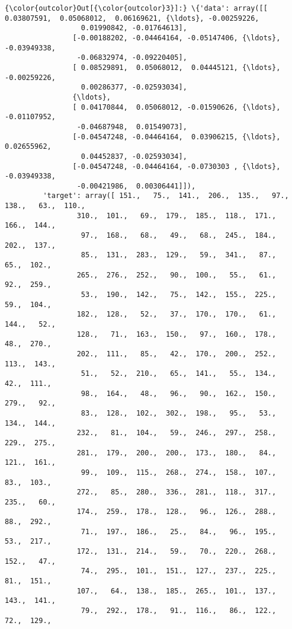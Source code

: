 \documentclass[11pt]{article}
\begin{document}
\begin{Verbatim}[commandchars=\\\{\}]
{\color{outcolor}Out[{\color{outcolor}3}]:} \{'data': array([[ 0.03807591,  0.05068012,  0.06169621, {\ldots}, -0.00259226,
                  0.01990842, -0.01764613],
                [-0.00188202, -0.04464164, -0.05147406, {\ldots}, -0.03949338,
                 -0.06832974, -0.09220405],
                [ 0.08529891,  0.05068012,  0.04445121, {\ldots}, -0.00259226,
                  0.00286377, -0.02593034],
                {\ldots}, 
                [ 0.04170844,  0.05068012, -0.01590626, {\ldots}, -0.01107952,
                 -0.04687948,  0.01549073],
                [-0.04547248, -0.04464164,  0.03906215, {\ldots},  0.02655962,
                  0.04452837, -0.02593034],
                [-0.04547248, -0.04464164, -0.0730303 , {\ldots}, -0.03949338,
                 -0.00421986,  0.00306441]]),
         'target': array([ 151.,   75.,  141.,  206.,  135.,   97.,  138.,   63.,  110.,
                 310.,  101.,   69.,  179.,  185.,  118.,  171.,  166.,  144.,
                  97.,  168.,   68.,   49.,   68.,  245.,  184.,  202.,  137.,
                  85.,  131.,  283.,  129.,   59.,  341.,   87.,   65.,  102.,
                 265.,  276.,  252.,   90.,  100.,   55.,   61.,   92.,  259.,
                  53.,  190.,  142.,   75.,  142.,  155.,  225.,   59.,  104.,
                 182.,  128.,   52.,   37.,  170.,  170.,   61.,  144.,   52.,
                 128.,   71.,  163.,  150.,   97.,  160.,  178.,   48.,  270.,
                 202.,  111.,   85.,   42.,  170.,  200.,  252.,  113.,  143.,
                  51.,   52.,  210.,   65.,  141.,   55.,  134.,   42.,  111.,
                  98.,  164.,   48.,   96.,   90.,  162.,  150.,  279.,   92.,
                  83.,  128.,  102.,  302.,  198.,   95.,   53.,  134.,  144.,
                 232.,   81.,  104.,   59.,  246.,  297.,  258.,  229.,  275.,
                 281.,  179.,  200.,  200.,  173.,  180.,   84.,  121.,  161.,
                  99.,  109.,  115.,  268.,  274.,  158.,  107.,   83.,  103.,
                 272.,   85.,  280.,  336.,  281.,  118.,  317.,  235.,   60.,
                 174.,  259.,  178.,  128.,   96.,  126.,  288.,   88.,  292.,
                  71.,  197.,  186.,   25.,   84.,   96.,  195.,   53.,  217.,
                 172.,  131.,  214.,   59.,   70.,  220.,  268.,  152.,   47.,
                  74.,  295.,  101.,  151.,  127.,  237.,  225.,   81.,  151.,
                 107.,   64.,  138.,  185.,  265.,  101.,  137.,  143.,  141.,
                  79.,  292.,  178.,   91.,  116.,   86.,  122.,   72.,  129.,

\end{Verbatim}
\end{document}
